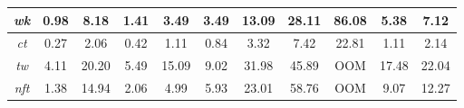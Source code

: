 \begin{table}[htbp]
\begin{tabular}{|c|c|c|cc|cc|cc|cc|}
\emph{wk}   & 0.98 & 8.18  & \multicolumn{1}{c|}{1.41} & 3.49  & \multicolumn{1}{c|}{3.49} & 13.09 & \multicolumn{1}{c|}{28.11} & 86.08 & \multicolumn{1}{c|}{5.38}  & 7.12  \\ \hline
\emph{ct}   & 0.27 & 2.06  & \multicolumn{1}{c|}{0.42} & 1.11  & \multicolumn{1}{c|}{0.84} & 3.32  & \multicolumn{1}{c|}{7.42}  & 22.81 & \multicolumn{1}{c|}{1.11}  & 2.14  \\ \hline
\emph{tw}   & 4.11 & 20.20 & \multicolumn{1}{c|}{5.49} & 15.09 & \multicolumn{1}{c|}{9.02} & 31.98 & \multicolumn{1}{c|}{45.89} & OOM   & \multicolumn{1}{c|}{17.48} & 22.04 \\ \hline
\emph{nft}  & 1.38 & 14.94 & \multicolumn{1}{c|}{2.06} & 4.99  & \multicolumn{1}{c|}{5.93} & 23.01 & \multicolumn{1}{c|}{58.76} & OOM   & \multicolumn{1}{c|}{9.07}  & 12.27 \\ \hline
\end{tabular}%
\end{table}

